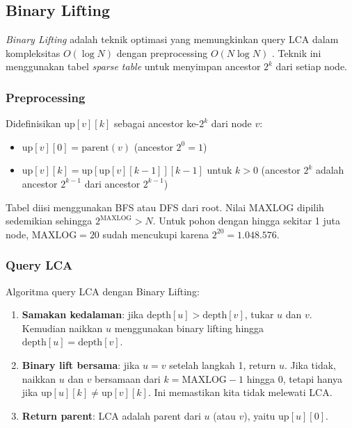 \subsection{Binary Lifting}

\textit{Binary Lifting} adalah teknik optimasi yang memungkinkan query LCA dalam
kompleksitas $O(\log N)$ dengan preprocessing $O(N \log N)$ \cite{bender2000lca}.
Teknik ini menggunakan tabel \textit{sparse table} untuk menyimpan ancestor
$2^k$ dari setiap node.

\subsubsection{Preprocessing}

Didefinisikan $\text{up}[v][k]$ sebagai ancestor ke-$2^k$ dari node $v$:
\begin{itemize}
    \item $\text{up}[v][0] = \text{parent}(v)$ (ancestor $2^0 = 1$)
    \item $\text{up}[v][k] = \text{up}[\text{up}[v][k-1]][k-1]$ untuk $k > 0$
    (ancestor $2^k$ adalah ancestor $2^{k-1}$ dari ancestor $2^{k-1}$)
\end{itemize}

Tabel diisi menggunakan BFS atau DFS dari root. Nilai $\text{MAXLOG}$ dipilih
sedemikian sehingga $2^{\text{MAXLOG}} > N$. Untuk pohon dengan hingga sekitar
1 juta node, $\text{MAXLOG} = 20$ sudah mencukupi karena $2^{20} = 1.048.576$.

\subsubsection{Query LCA}

Algoritma query LCA dengan Binary Lifting:
\begin{enumerate}
    \item \textbf{Samakan kedalaman}: jika $\text{depth}[u] > \text{depth}[v]$,
    tukar $u$ dan $v$. Kemudian naikkan $u$ menggunakan binary lifting hingga
    $\text{depth}[u] = \text{depth}[v]$.
    
    \item \textbf{Binary lift bersama}: jika $u = v$ setelah langkah 1, return $u$.
    Jika tidak, naikkan $u$ dan $v$ bersamaan dari $k = \text{MAXLOG}-1$ hingga
    $0$, tetapi hanya jika $\text{up}[u][k] \neq \text{up}[v][k]$. Ini memastikan
    kita tidak melewati LCA.
    
    \item \textbf{Return parent}: LCA adalah parent dari $u$ (atau $v$), yaitu
    $\text{up}[u][0]$.
\end{enumerate}

